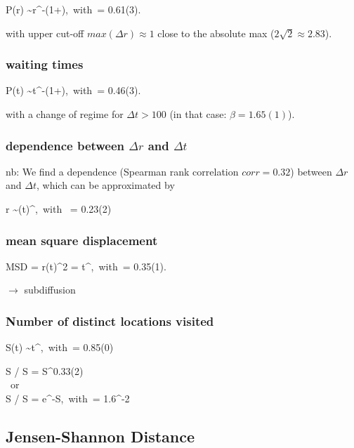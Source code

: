 \be
P(\Delta r) \sim r^{-(1+\alpha)},~with~\alpha = 0.61(3).
\ee

with upper cut-off $max(\Delta r) \approx 1$ close to the absolute max ($2\sqrt{2} \approx 2.83$).

\subsubsection{waiting times}

\be
P(\Delta t) \sim t^{-(1+\beta)},~with~\beta = 0.46(3).
\ee

with a change of regime for $\Delta t > 100$ (in that case: $\beta = 1.65(1)$).

\subsubsection{dependence between $\Delta r$ and $\Delta t$}

nb: We find a dependence (Spearman rank correlation $corr = 0.32$) between  $\Delta r$ and $\Delta t$, which can be approximated by

\be
\Delta r \sim {(\Delta t)}^{\nu},~with ~\nu = 0.23(2)
\ee


\subsubsection{mean square displacement}

\be
MSD = \langle r(t)^2 \rangle = t^{\gamma},~with~\gamma = 0.35(1).
\ee

$\rightarrow$ subdiffusion

\subsubsection{Number of distinct locations visited}

\be
S(t) \sim t^{\mu},~with~\mu = 0.85(0)
\ee

\begin{center}
\ba
\Delta S / \langle S \rangle = S^{0.33(2)}\\
~or~\\
\Delta S / \langle S \rangle = e^{-\lambda S},~with~\lambda = 1.6^{-2}
\ea
\end{center}



\clearpage



\subsection{Jensen-Shannon Distance}


